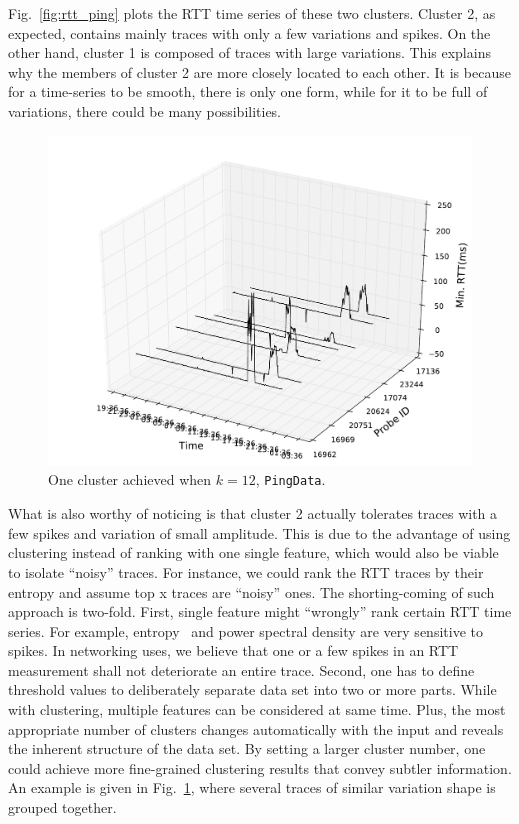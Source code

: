 Fig.~\ref{fig:rtt_ping} plots the RTT time series of these two clusters. Cluster 2, as expected, contains mainly traces with only a few variations and spikes. 
On the other hand, cluster 1 is composed of traces with large variations.
This explains why the members of cluster 2 are more closely located to each other. 
It is because for a time-series to be smooth, there is only one form, while for it to be full of variations, there could be many possibilities.

\begin{figure}[!htb]
\centering
\includegraphics[width=\textwidth]{gfx/chap3/rtt3d_ft_pam_cls8.pdf}
\caption{One cluster achieved when $k=12$, \texttt{PingData}.}
\label{fig:cls8_k12}
\end{figure}

What is also worthy of noticing is that cluster 2 actually tolerates traces with a few spikes and variation of small amplitude. 
This is due to the advantage of using clustering instead of ranking with one single feature, which would also be viable to isolate ``noisy'' traces. 
For instance, we could rank the RTT traces by their entropy and assume top x traces are ``noisy'' ones. 
The shorting-coming of such approach is two-fold.
First, single feature might ``wrongly'' rank certain RTT time series. 
For example, entropy~\cite{Molina-Pico2011} and power spectral density are very sensitive to spikes. 
In networking uses, we believe that one or a few spikes in an RTT measurement shall not deteriorate an entire trace. 
Second, one has to define threshold values to deliberately separate data set into two or more parts. 
While with clustering, multiple features can be considered at same time. 
Plus, the most appropriate number of clusters changes automatically with the input and reveals the inherent structure of the data set. 
By setting a larger cluster number, one could achieve more fine-grained clustering results that convey subtler information. An example is given in Fig.~\ref{fig:cls8_k12}, where several traces of similar variation shape is grouped together.

